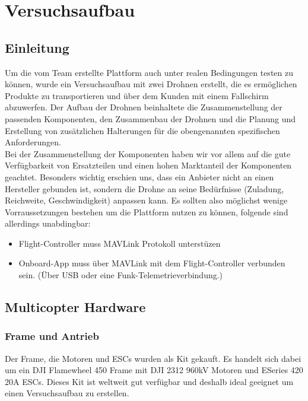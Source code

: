 \chapter{Versuchsaufbau}

\section{Einleitung}

Um die vom Team erstellte Plattform auch unter realen Bedingungen testen zu können, wurde ein Versuchsaufbau mit zwei Drohnen erstellt, die es ermöglichen Produkte zu transportieren und über dem Kunden mit einem Fallschirm abzuwerfen. Der Aufbau der Drohnen beinhaltete die Zusammenstellung der passenden Komponenten, den Zusammenbau der Drohnen und die Planung und Erstellung von zusätzlichen Halterungen für die obengenannten spezifischen Anforderungen.\\

Bei der Zusammenstellung der Komponenten haben wir vor allem auf die gute Verfügbarkeit von Ersatzteilen und einen hohen Marktanteil der Komponenten geachtet. Besonders wichtig erschien uns, dass ein Anbieter nicht an einen Hersteller gebunden ist, sondern die Drohne an seine Bedürfnisse (Zuladung, Reichweite, Geschwindigkeit) anpassen kann. Es sollten also möglichst wenige Vorraussetzungen bestehen um die Plattform nutzen zu können, folgende sind allerdings unabdingbar:

\begin{itemize}

\item Flight-Controller muss \Gls{MAVLink} Protokoll unterstüzen
\item Onboard-App muss über MAVLink mit dem Flight-Controller verbunden sein. (Über USB oder eine Funk-Telemetrieverbindung.)
\end{itemize}

\section{Multicopter Hardware}

\subsection{Frame und Antrieb}

Der Frame, die Motoren und ESCs wurden als Kit gekauft. Es handelt sich dabei um ein DJI Flamewheel 450 Frame mit DJI 2312 960kV Motoren und ESeries 420 20A ESCs. Dieses Kit ist weltweit gut verfügbar und deshalb ideal geeignet um einen Versuchsaufbau zu erstellen.

